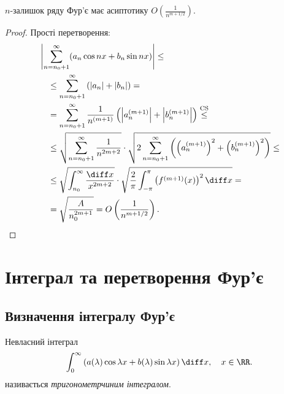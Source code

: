 \begin{proposition}
    $n$-залишок ряду Фур'є має асиптотику $O \left( \frac{1}{n^{m + 1/2}} \right)$.
\end{proposition}
\begin{proof}
    Прості перетворення:
    \begin{equation}
        \begin{aligned}
            & \left| \sum_{n = n_0 + 1}^\infty (a_n \cos n x + b_n \sin n x) \right| \le \\
            &\quad \le \sum_{n = n_0 + 1}^\infty \left( |a_n| + |b_n| \right) = \\
            &\quad = \sum_{n = n_0 + 1}^\infty \frac{1}{n^{(m + 1)}} \left( \left|a_n^{(m + 1)}\right| + \left|b_n^{(m + 1)}\right| \right) \overset{\text{CS}}{\le} \\
            &\quad \le \sqrt{ \sum_{n = n_0 + 1}^\infty \frac{1}{n^{2 m + 2}} } \cdot \sqrt{ 2 \sum_{n = n_0 + 1}^\infty \left( \left( a_n^{(m + 1)} \right)^2 + \left( b_n^{(m + 1)} \right)^2 \right) } \le \\
            &\quad \le \sqrt{ \int_{n_0}^\infty \frac{\diff x}{x^{2 m + 2}}} \cdot \sqrt{ \frac{2}{\pi} \int_{-\pi}^\pi \left( f^{(m + 1)}(x) \right)^2 \diff x } = \\
            &\quad = \sqrt{\frac{A}{n_0^{2 m + 1}}} = O \left( \frac{1}{n^{m + 1/2}} \right).
        \end{aligned}
    \end{equation}
\end{proof}

\section{Інтеграл та перетворення Фур'є}

\subsection{Визначення інтегралу Фур'є}

\begin{definition}
    Невласний інтеграл
    \begin{equation}
        \int_0^\infty \left( a(\lambda) \cos \lambda x + b(\lambda) \sin \lambda x \right) \diff x, \quad x \in \RR.
    \end{equation}
    називається \textit{тригонометрчиним інтегралом}.
\end{definition}

